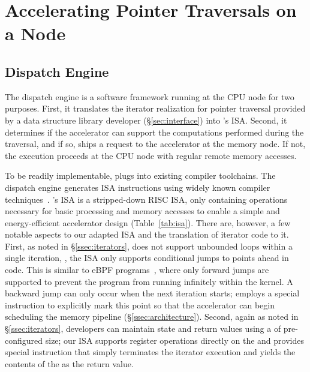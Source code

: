 \section{Accelerating Pointer Traversals on a Node}
\label{sec:accelerator}


\subsection{\pulse Dispatch Engine}\label{ssec:compute_node}
The dispatch engine is a software framework running at the CPU node for two purposes.  First, it translates the iterator realization for pointer traversal provided by a data structure library developer (\S\ref{sec:interface}) into \pulse's ISA. Second, it determines if the accelerator can support the computations performed during the traversal, and if so, ships a request to the accelerator at the memory node. If not, the execution proceeds at the CPU node with regular remote memory accesses.

 To be readily implementable, \pulse plugs into existing compiler toolchains. The dispatch engine generates \pulse ISA instructions using widely known compiler techniques~\cite{llvm}. 
\pulse's ISA is a stripped-down RISC ISA, only containing operations necessary for basic processing and memory accesses to enable a simple and energy-efficient accelerator design (Table~\ref{tab:isa}). There are, however, a few notable aspects to our adapted ISA and the translation of iterator code to it. First, as noted in \S\ref{ssec:iterators}, \pulse does not support unbounded loops within a single iteration, \ie, the ISA only supports conditional jumps to points ahead in code. This is similar to eBPF programs~\cite{ebpfjump}, where only forward jumps are supported to prevent the program from running infinitely within the kernel. A backward jump can only occur when the next iteration starts; \pulse employs a special  instruction to explicitly mark this point so that the accelerator can begin scheduling the memory pipeline (\S\ref{ssec:architecture}). Second, again as noted in \S\ref{ssec:iterators}, developers can maintain state and return values using a  of pre-configured size; our ISA supports register operations directly on the  and provides special  instruction that simply terminates the iterator execution and yields the contents of the  as the return value. 

